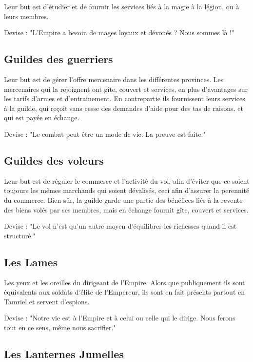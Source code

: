      Leur but est d'étudier et de fournir les services liés à la magie à la légion, ou à leurs membres.
      
      Devise : "L'Empire a besoin de mages loyaux et dévoués ? Nous sommes là !"
      
    \subsection{Guildes des guerriers}
    
      Leur but est de gérer l'offre mercenaire dans les différentes provinces. Les mercenaires qui la rejoignent ont gîte, couvert et services, en plus d'avantages sur les tarifs d'armes et d'entrainement. En contrepartie ils fournissent leurs services à la guilde, qui reçoit sans cesse des demandes d'aide pour des tas de raisons, et qui est payée en échange.
      
      Devise : "Le combat peut être un mode de vie. La preuve est faite."
      
    \subsection{Guildes des voleurs}
    
      Leur but est de réguler le commerce et l'activité du vol, afin d'éviter que ce soient toujours les mêmes marchands qui soient dévalisés, ceci afin d'assurer la perennité du commerce. Bien sûr, la guilde garde une partie des bénéfices liés à la revente des biens volés par ses membres, mais en échange fournit gîte, couvert et services.
      
      Devise : "Le vol n'est qu'un autre moyen d'équilibrer les richesses quand il est structuré."
      
    \subsection{Les Lames}
    
      Les yeux et les oreilles du dirigeant de l'Empire. Alors que publiquement ils sont équivalents aux soldats d'élite de l'Empereur, ils sont en fait présents partout en Tamriel et servent d'espions.
      
      Devise : "Notre vie est à l'Empire et à celui ou celle qui le dirige. Nous ferons tout en ce sens, même nous sacrifier."
    
    \subsection{Les Lanternes Jumelles}
    
